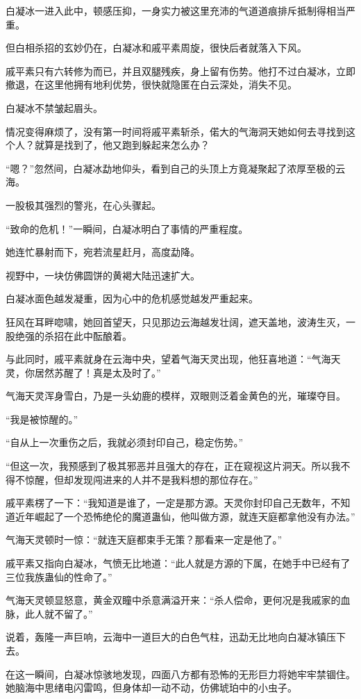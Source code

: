 \begin{this_body}
白凝冰一进入此中，顿感压抑，一身实力被这里充沛的气道道痕排斥抵制得相当严重。

但白相杀招的玄妙仍在，白凝冰和戚平素周旋，很快后者就落入下风。

戚平素只有六转修为而已，并且双腿残疾，身上留有伤势。他打不过白凝冰，立即撤退，在这里他拥有地利优势，很快就隐匿在白云深处，消失不见。

白凝冰不禁皱起眉头。

情况变得麻烦了，没有第一时间将戚平素斩杀，偌大的气海洞天她如何去寻找到这个人？就算是找到了，他又跑到躲起来怎么办？

“嗯？”忽然间，白凝冰勐地仰头，看到自己的头顶上方竟凝聚起了浓厚至极的云海。

一股极其强烈的警兆，在心头骤起。

“致命的危机！”一瞬间，白凝冰明白了事情的严重程度。

她连忙暴射而下，宛若流星赶月，高度勐降。

视野中，一块仿佛圆饼的黄褐大陆迅速扩大。

白凝冰面色越发凝重，因为心中的危机感觉越发严重起来。

狂风在耳畔唿啸，她回首望天，只见那边云海越发壮阔，遮天盖地，波涛生灭，一股绝强的杀招在此中酝酿着。

与此同时，戚平素就身在云海中央，望着气海天灵出现，他狂喜地道：“气海天灵，你居然苏醒了！真是太及时了。”

气海天灵浑身雪白，乃是一头幼鹿的模样，双眼则泛着金黄色的光，璀璨夺目。

“我是被惊醒的。”

“自从上一次重伤之后，我就必须封印自己，稳定伤势。”

“但这一次，我预感到了极其邪恶并且强大的存在，正在窥视这片洞天。所以我不得不惊醒，但却发现闯进来的人并不是我料想的那位存在。”

戚平素楞了一下：“我知道是谁了，一定是那方源。天灵你封印自己无数年，不知道近年崛起了一个恐怖绝伦的魔道蛊仙，他叫做方源，就连天庭都拿他没有办法。”

气海天灵顿时一惊：“就连天庭都束手无策？那看来一定是他了。”

戚平素又指向白凝冰，气愤无比地道：“此人就是方源的下属，在她手中已经有了三位我族蛊仙的性命了。”

气海天灵顿显怒意，黄金双瞳中杀意满溢开来：“杀人偿命，更何况是我戚家的血脉，此人就不留了。”

说着，轰隆一声巨响，云海中一道巨大的白色气柱，迅勐无比地向白凝冰镇压下去。

在这一瞬间，白凝冰惊骇地发现，四面八方都有恐怖的无形巨力将她牢牢禁锢住。她脑海中思绪电闪雷鸣，但身体却一动不动，仿佛琥珀中的小虫子。


\end{this_body}
